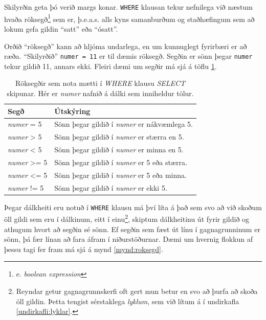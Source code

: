 Skilyrðin geta þó verið margs konar. \verb|WHERE| klausan tekur nefnilega við næstum hvaða röksegð\footnote{e. \emph{boolean expression}} sem er, þ.e.a.s. alls kyns samanburðum og staðhæfingum sem að lokum gefa gildin ``satt'' eða ``ósatt''.

Orðið ``röksegð'' kann að hljóma undarlega, en um kunnuglegt fyrirbæri er að ræða. ``Skilyrðið'' \verb|numer = 11| er til dæmis röksegð. Segðin er sönn þegar \verb|numer| tekur gildið 11, annars ekki. Fleiri dæmi um segðir má sjá á töflu \ref{tafla:samanburdir}.

\begin{table}
\centering
\caption[Röksegðir]{Röksegðir sem nota mætti í \emph{WHERE} klausu \emph{SELECT} skipunar. Hér er \emph{numer} nafnið á dálki sem inniheldur tölur.}
\label{tafla:samanburdir}
\begin{tabular}{ll}
\toprule
Segð&Útskýring\\
\midrule
\emph{numer} = 5&Sönn þegar gildið í \emph{numer} er nákvæmlega 5.\\
\emph{numer} > 5&Sönn þegar gildið í \emph{numer} er stærra en 5.\\
\emph{numer} < 5&Sönn þegar gildið í \emph{numer} er minna en 5.\\
\emph{numer} >= 5&Sönn þegar gildið í \emph{numer} er 5 eða stærra.\\
\emph{numer} <= 5&Sönn þegar gildið í \emph{numer} er 5 eða minna.\\
\emph{numer} != 5&Sönn þegar gildið í \emph{numer} er ekki 5.\\
\bottomrule
\end{tabular}
\end{table}

Þegar dálkheiti eru notuð í \verb|WHERE| klausu má því líta á það sem svo að við skoðum öll gildi sem eru í dálkinum, eitt í einu\footnote{Reyndar getur gagnagrunnskerfi oft gert mun betur en svo að þurfa að skoða öll gildin. Þetta tengist sérstaklega \emph{lyklum}, sem við lítum á í undirkafla \ref{undirkafli:lyklar}.}, skiptum dálkheitinu út fyrir gildið og athugum hvort að segðin sé sönn. Ef segðin sem fæst út línu í gagnagrunninum er sönn, þá fær línan að fara áfram í niðurstöðurnar. Dæmi um hvernig flokkun af þessu tagi fer fram má sjá á mynd \ref{mynd:roksegd}.

